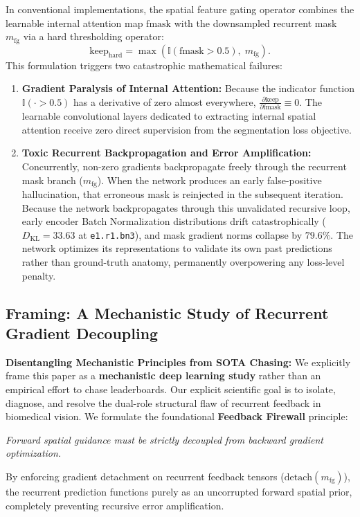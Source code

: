 In conventional implementations, the spatial feature gating operator combines
the learnable internal attention map $\text{fmask}$ with the downsampled
recurrent mask $m_{\text{fg}}$ via a hard thresholding operator:
\begin{equation}
  \label{eq:hard_gate_intro}
  \text{keep}_{\text{hard}} =
    \max\left(\mathbb{I}(\text{fmask} > 0.5),\; m_{\text{fg}}\right).
\end{equation}
This formulation triggers two catastrophic mathematical failures:
\begin{enumerate}
  \item \textbf{Gradient Paralysis of Internal Attention:}
        Because the indicator function $\mathbb{I}(\cdot > 0.5)$ has a
        derivative of zero almost everywhere,
        $\frac{\partial \text{keep}}{\partial \text{fmask}} \equiv 0$.
        The learnable convolutional layers dedicated to extracting internal
        spatial attention receive zero direct supervision from the segmentation
        loss objective.
  \item \textbf{Toxic Recurrent Backpropagation and Error Amplification:}
        Concurrently, non-zero gradients backpropagate freely through the
        recurrent mask branch ($m_{\text{fg}}$). When the network produces an
        early false-positive hallucination, that erroneous mask is reinjected
        in the subsequent iteration. Because the network backpropagates
        through this unvalidated recursive loop, early encoder Batch
        Normalization distributions drift catastrophically ($D_{\text{KL}} = 33.63$
        at \texttt{e1.r1.bn3}), and mask gradient norms collapse by $79.6\%$.
        The network optimizes its representations to validate its own past
        predictions rather than ground-truth anatomy, permanently overpowering
        any loss-level penalty.
\end{enumerate}

\subsection{Framing: A Mechanistic Study of Recurrent Gradient Decoupling}
\textbf{Disentangling Mechanistic Principles from SOTA Chasing:}
We explicitly frame this paper as a \textbf{mechanistic deep learning study}
rather than an empirical effort to chase leaderboards. Our explicit scientific
goal is to isolate, diagnose, and resolve the dual-role structural flaw of
recurrent feedback in biomedical vision. We formulate the foundational
\textbf{Feedback Firewall} principle:
\begin{center}
  \textit{Forward spatial guidance must be strictly decoupled from backward gradient optimization.}
\end{center}
By enforcing gradient detachment on recurrent feedback tensors ($\text{detach}(m_{\text{fg}})$),
the recurrent prediction functions purely as an uncorrupted forward spatial prior,
completely preventing recursive error amplification.

